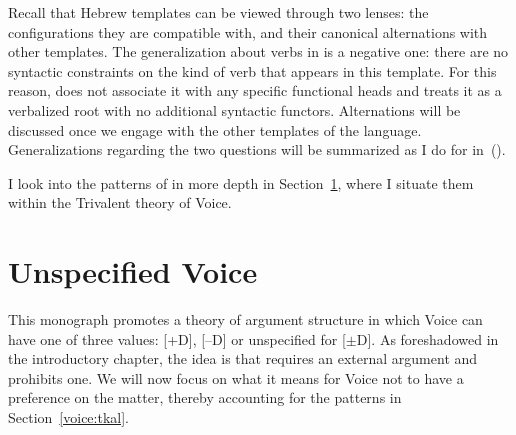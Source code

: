 \begin{exe}
\begin{xlist}
\begin{exe}
\begin{xlist}
\begin{exe}
\begin{xlist}
\begin{exe}
\begin{exe}
\begin{xlist}
\begin{exe}
\begin{xlist}
\begin{exe}
\begin{xlist}
\begin{exe}
\begin{xlist}
\begin{exe}
\begin{xlist}
\begin{exe}
\begin{xlist}
\begin{exe}
\begin{xlist}
\begin{exe}
\begin{xlist}
\begin{exe}
\begin{xlist}
\begin{exe}
\begin{xlist}
\begin{exe}
\begin{xlist}
Recall that Hebrew templates can be viewed through two lenses: the configurations they are compatible with, and their canonical alternations with other templates. The generalization about verbs in {\tkal} is a negative one: there are no syntactic constraints on the kind of verb that appears in this template. For this reason, \cite{doron03} does not associate it with any specific functional heads and \cite{borer13oup,borer15roots} treats it as a verbalized root with no additional syntactic functors. Alternations will be discussed once we engage with the other templates of the language. Generalizations regarding the two questions will be summarized as I do for {\tkal} in~(\nextx).


I look into the patterns of {\tkal} in more depth in Section~\ref{voice:voice}, where I situate them within the Trivalent theory of Voice.

\section{Unspecified Voice} \label{voice:voice}
This monograph promotes a theory of argument structure in which Voice can have one of three values: [\!+\!D], [--D] or unspecified for [$\pm$D]. As foreshadowed in the introductory chapter, the idea is that {\vd} requires an external argument and {\vz} prohibits one. We will now focus on what it means for Voice not to have a preference on the matter, thereby accounting for the patterns in Section~\ref{voice:tkal}.


\end{xlist}
\end{exe}
\end{xlist}
\end{exe}
\end{xlist}
\end{exe}
\end{xlist}
\end{exe}
\end{xlist}
\end{exe}
\end{xlist}
\end{exe}
\end{xlist}
\end{exe}
\end{xlist}
\end{exe}
\end{xlist}
\end{exe}
\end{xlist}
\end{exe}
\end{xlist}
\end{exe}
\end{exe}
\end{xlist}
\end{exe}
\end{xlist}
\end{exe}
\end{xlist}
\end{exe}
